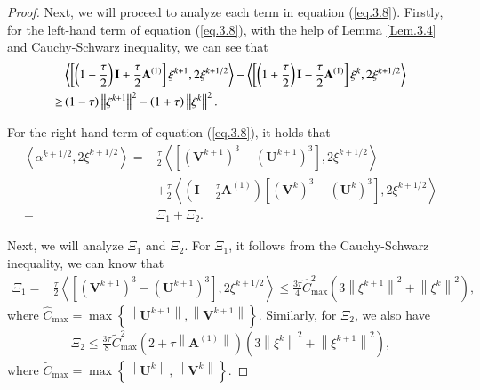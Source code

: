 \documentclass{siamart171218}
\numberwithin{theorem}{section}
\numberwithin{equation}{section}
\begin{document}
\begin{proof}
Next, we will proceed to analyze each term in equation (\ref{eq.3.8}). Firstly, for the left-hand
 term of equation (\ref{eq.3.8}), with the help of  Lemma \ref{Lem.3.4} and
 Cauchy-Schwarz inequality,
 we can see that
\begin{equation}\label{eq.3.9}
\begin{aligned}\displaystyle
&\left\langle\left[\left(1-\frac{\tau}{2}\right)\mathbf{I}+\frac{\tau}{2}\mathbf{A}^{(1)}
\right]\mathbf{\xi}^{k+1},2\xi^{k+1/2}\right\rangle
-\left\langle\left[\left(1+\frac{\tau}{2}\right)\mathbf{I}-\frac{\tau}{2}\mathbf{A}^{(1)}
\right]\mathbf{\xi}^{k},2\xi^{k+1/2}\right\rangle\\
\geq&\left(1-\tau\right)
\left\|\mathbf{\xi}^{k+1}\right\|^2
-\left(1+\tau\right)
\left\|\mathbf{\xi}^{k}\right\|^2.
\end{aligned}
\end{equation}

For the right-hand term of equation (\ref{eq.3.8}),
it holds that
\begin{equation}\label{eq.3.10}
\begin{aligned}\displaystyle
\left\langle\alpha^{k+1/2},2\xi^{k+1/2}\right\rangle
=&\frac{\tau}{2}\left\langle\left[\left(\mathbf{V}^{k+1}\right)^3-\left(\mathbf{U}^{k+1}\right)^3
\right],2\xi^{k+1/2}\right\rangle\\
&+\frac{\tau}{2}\left\langle\left(
\mathbf{I}-\frac{\tau}{2}\mathbf{A}^{(1)}
\right)\left[\left(\mathbf{V}^{k}\right)^3-\left(\mathbf{U}^{k}\right)^3\right],
2\xi^{k+1/2}\right\rangle\\
=&\Xi_1+\Xi_2.
\end{aligned}
\end{equation}

Next, we will analyze $\Xi_1$ and $\Xi_2$. For $\Xi_1$, it follows from
the Cauchy-Schwarz inequality,
we can know that
\begin{equation}\label{eq.3.11}
\begin{aligned}\displaystyle
\Xi_1
=&\frac{\tau}{2}\left\langle\left[\left(\mathbf{V}^{k+1}\right)^3-\left(\mathbf{U}^{k+1}\right)^3
\right],2\xi^{k+1/2}\right\rangle\leq\frac{3\tau}{4}
\hat{C}_{\max}^2\left(3\left\|\xi^{k+1}\right\|^2+\left\|\xi^{k}\right\|^2\right),
\end{aligned}
\end{equation}
where $\hat{C}_{\max}=\max\left\{\left\|\mathbf{U}^{k+1}\right\|,\left\|\mathbf{V}^{k+1}\right\|\right\}$.
Similarly, for $\Xi_2$, we also have
\begin{equation}\label{eq.3.12}
\begin{aligned}\displaystyle
\Xi_2\leq\frac{3\tau}{8}
\tilde{C}_{\max}^2
\left(2+\tau\left\|\mathbf{A}^{(1)}\right\|\right)
\left(3\left\|\xi^{k}\right\|^2+\left\|\xi^{k+1}\right\|^2\right),
\end{aligned}
\end{equation}
where $\tilde{C}_{\max}=\max\left\{\left\|\mathbf{U}^{k}\right\|,
\left\|\mathbf{V}^{k}\right\|\right\}$.


\end{proof}
\end{document}
